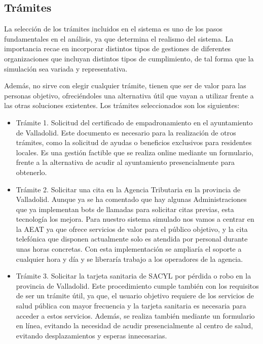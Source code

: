     \subsection{Trámites}
        La selección de los trámites incluidos en el sistema es uno de los pasos fundamentales en el análisis, ya que determina el realismo del sistema. 
        La importancia recae en incorporar distintos tipos de gestiones de diferentes organizaciones que incluyan distintos tipos de cumplimiento, de tal forma que la simulación sea variada y representativa. 
            
        Además, no sirve con elegir cualquier trámite, tienen que ser de valor para las personas objetivo, ofreciéndoles una alternativa útil que vayan a utilizar frente a las otras soluciones existentes.
        Los trámites seleccionados son los siguientes:
        \begin{itemize}
            \item Trámite 1. Solicitud del certificado de empadronamiento en el ayuntamiento de Valladolid. 
                Este documento es necesario para la realización de otros trámites, como la solicitud de ayudas o beneficios exclusivos para residentes locales. 
                Es una gestión factible que se realiza online mediante un formulario, frente a la alternativa de acudir al ayuntamiento presencialmente para obtenerlo. 
            \item Trámite 2. Solicitar una cita en la Agencia Tributaria en la provincia de Valladolid. 
                Aunque ya se ha comentado que hay algunas Administraciones que ya implementan bots de llamadas para solicitar citas previas, esta tecnología los mejora. 
                Para nuestro sistema simulado nos vamos a centrar en la AEAT ya que ofrece servicios de valor para el público objetivo, y la cita telefónica que disponen actualmente solo es atendida por personal durante unas horas concretas. 
                Con esta implementación se ampliaría el soporte a cualquier hora y día y se liberaría trabajo a los operadores de la agencia.
            \item Trámite 3. Solicitar la tarjeta sanitaria de SACYL por pérdida o robo en la provincia de Valladolid. 
                Este procedimiento cumple también con los requisitos de ser un trámite útil, ya que, el usuario objetivo requiere de los servicios de salud pública con mayor frecuencia y la tarjeta sanitaria es necesaria para acceder a estos servicios. 
                Además, se realiza también mediante un formulario en línea, evitando la necesidad de acudir presencialmente al centro de salud, evitando desplazamientos y esperas innecesarias.
        \end{itemize}
            
